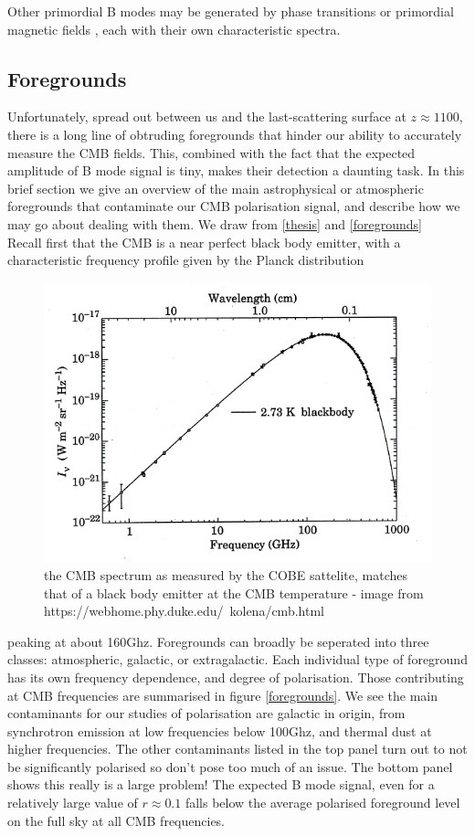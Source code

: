 \documentclass[a4paper,10pt]{article}
\begin{document}
Other primordial B modes may be generated by phase transitions \cite{phase} or primordial magnetic fields \cite{magnetic}, each with their own characteristic spectra.

\subsection{Foregrounds}

Unfortunately, spread out between us and the last-scattering surface at $z\approx 1100$, there is a long line of obtruding foregrounds that hinder our ability to accurately measure the CMB fields. This, combined with the fact that the expected amplitude of B mode signal is tiny, makes their detection a daunting task. In this brief section we give an overview of the main astrophysical or atmospheric foregrounds that contaminate our CMB polarisation signal, and describe how we may go about dealing with them. We draw from \ref{thesis} and \ref{foregrounds}\\

Recall first that the CMB is a near perfect black body emitter, with a characteristic frequency profile given by the Planck distribution

\begin{figure}[h]
  \includegraphics[width=0.4\linewidth]{cmbspectrum1.png}
  \centering
  \caption{the CMB spectrum as measured by the COBE sattelite, matches that of a black body emitter at the CMB temperature - image from https://webhome.phy.duke.edu/~kolena/cmb.html  }
\end{figure}

peaking at about 160Ghz. Foregrounds can broadly be seperated into three classes: atmospheric, galactic, or extragalactic. Each individual type of foreground has its own frequency dependence, and degree of polarisation. Those contributing at CMB frequencies are summarised in figure \ref{foregrounds}. We see the main contaminants for our studies of polarisation are galactic in origin, from synchrotron emission at low frequencies below 100Ghz, and thermal dust at higher frequencies. The other contaminants listed in the top panel turn out to not be significantly polarised so don't pose too much of an issue. The bottom panel shows this really is a large problem! The expected B mode signal, even for a relatively large value of $r\approx0.1$ falls below the average polarised foreground level on the full sky at all CMB frequencies.
\end{document}
